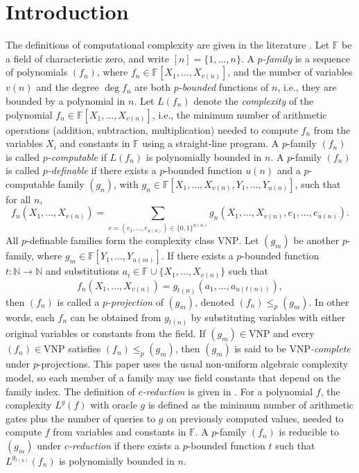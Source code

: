 \documentclass[11pt,a4paper]{article}
\begin{document}
\section{Introduction}%
The definitions of computational complexity are given in the literature \cite{Bur1,Bur2,val}. Let $\mathbb{F}$ be a field of characteristic zero, and write $[n]=\{1,\ldots,n\}$. A {\em $p$-family} is a sequence of polynomials $(f_n)$, where $f_n\in \mathbb{F}[X_1, \ldots, X_{v(n)}]$, and the number of variables $v(n)$ and the degree $\deg f_n$ are both {\em $p$-bounded} functions of $n$, i.e., they are bounded by a polynomial in $n$. Let $L(f_n)$ denote the {\em complexity} of the polynomial $f_n \in \mathbb{F}[X_1, \ldots, X_{v(n)}]$, i.e., the minimum number of arithmetic operations (addition, subtraction, multiplication) needed to compute $f_n$ from the variables $X_i$ and constants in $\mathbb{F}$ using a straight‐line program.
A $p$-family $(f_n)$ is called {\em $p$-computable} if $L(f_n)$ is polynomially bounded in $n$. A $p$-family $(f_n)$ is called {\em $p$-definable} if there exists a $p$-bounded function $u(n)$ and a $p$-computable family $(g_n)$, with $g_n\in \mathbb{F}[X_1,\ldots,X_{v(n)},Y_1,\ldots,Y_{u(n)}]$, such that for all $n$,
$$
f_n(X_1, \ldots, X_{v(n)})
=\sum_{e=(e_1,\ldots,e_{u(n)})\in\{0,1\}^{u(n)}}
g_n(X_1,\ldots,X_{v(n)},e_1,\ldots,e_{u(n)}).
$$
All $p$-definable families form the complexity class $\mathrm{VNP}$. Let $(g_m)$ be another $p$-family, where $g_m\in \mathbb{F}[Y_1,\ldots,Y_{u(m)}]$. If there exists a $p$-bounded function $t:\mathbb{N}\to\mathbb{N}$ and substitutions $a_i\in \mathbb{F}\cup\{X_1,\ldots,X_{v(n)}\}$ such that
$$
f_n(X_1,\ldots,X_{v(n)})
=g_{t(n)}(a_1,\ldots,a_{u(t(n))}),
$$
then $(f_n)$ is called a {\em $p$-projection} of $(g_m)$, denoted $(f_n)\leq_p(g_m)$. In other words, each $f_n$ can be obtained from $g_{t(n)}$ by substituting variables with either original variables or constants from the field. If $(g_m)\in \mathrm{VNP}$ and every $(f_n)\in \mathrm{VNP}$ satisfies $(f_n)\leq_p(g_m)$, then $(g_m)$ is said to be {\em $\mathrm{VNP}$-complete} under $p$-projections. This paper uses the usual non‐uniform algebraic complexity model, so each member of a family may use field constants that depend on the family index. The definition of {\em $c$-reduction} is given in \cite{rug}. For a polynomial $f$, the complexity $L^g(f)$ with oracle $g$ is defined as the minimum number of arithmetic gates plus the number of queries to $g$ on previously computed values, needed to compute $f$ from variables and constants in $\mathbb{F}$. A $p$-family $(f_n)$ is reducible to $(g_m)$ under {\em $c$-reduction} if there exists a $p$-bounded function $t$ such that $L^{g_{t(n)}}(f_n)$ is polynomially bounded in $n$.
\end{document}
